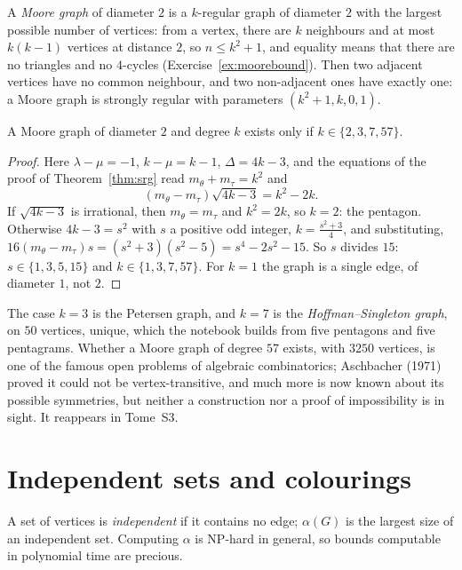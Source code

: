 A \emph{Moore graph} of diameter $2$ is a $k$-regular graph of diameter $2$ with the largest possible number of vertices: from a
vertex, there are $k$ neighbours and at most $k(k-1)$ vertices at distance $2$, so $n\le k^2+1$, and equality means that there are no
triangles and no $4$-cycles (Exercise~\ref{ex:moorebound}). Then two adjacent vertices have no common neighbour, and two non-adjacent
ones have exactly one: a Moore graph is strongly regular with parameters $(k^2+1,k,0,1)$.

\begin{theorem}\label{thm:moore}
A Moore graph of diameter $2$ and degree $k$ exists only if $k\in\{2,3,7,57\}$.
\end{theorem}
\begin{proof}
Here $\lambda-\mu=-1$, $k-\mu=k-1$, $\Delta=4k-3$, and the equations of the proof of Theorem~\ref{thm:srg} read $m_\theta+m_\tau=k^2$
and
\[
(m_\theta-m_\tau)\sqrt{4k-3}=k^2-2k.
\]
If $\sqrt{4k-3}$ is irrational, then $m_\theta=m_\tau$ and $k^2=2k$, so $k=2$: the pentagon. Otherwise $4k-3=s^2$ with $s$ a positive
odd integer, $k=\frac{s^2+3}4$, and substituting, $16(m_\theta-m_\tau)s=(s^2+3)(s^2-5)=s^4-2s^2-15$. So $s$ divides $15$:
$s\in\{1,3,5,15\}$ and $k\in\{1,3,7,57\}$. For $k=1$ the graph is a single edge, of diameter $1$, not $2$.
\end{proof}

The case $k=3$ is the Petersen graph, and $k=7$ is the \emph{Hoffman--Singleton graph}, on $50$ vertices, unique, which the notebook
builds from five pentagons and five pentagrams. Whether a Moore graph of degree $57$ exists, with $3250$ vertices, is one of the
famous open problems of algebraic combinatorics; Aschbacher (1971) proved it could not be vertex-transitive, and much more is now
known about its possible symmetries, but neither a construction nor a proof of impossibility is in sight. It reappears in
Tome~S3.

\section{Independent sets and colourings}

A set of vertices is \emph{independent} if it contains no edge; $\alpha(G)$ is the largest size of an independent set. Computing
$\alpha$ is NP-hard in general, so bounds computable in polynomial time are precious.

